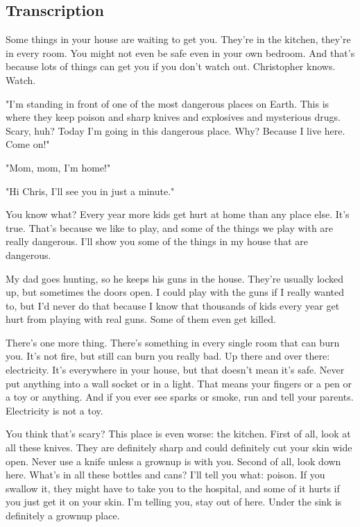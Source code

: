 \subsection{Transcription}

Some things in your house are waiting to get you. They're in the kitchen, they're in every room. You might not even be safe even in your own bedroom. And that's because lots of things can get you if you don't watch out. Christopher knows. Watch.

"I'm standing in front of one of the most dangerous places on Earth. This is where they keep poison and sharp knives and explosives and mysterious drugs. Scary, huh? Today I'm going in this dangerous place. Why? Because I live here. Come on!"

"Mom, mom, I'm home!"

"Hi Chris, I'll see you in just a minute."

You know what? Every year more kids get hurt at home than any place else. It's true. That's because we like to play, and some of the things we play with are really dangerous. I'll show you some of the things in my house that are dangerous.

My dad goes hunting, so he keeps his guns in the house. They're usually locked up, but sometimes the doors open. I could play with the guns if I really wanted to, but I'd never do that because I know that thousands of kids every year get hurt from playing with real guns. Some of them even get killed.

There's one more thing. There's something in every single room that can burn you. It's not fire, but still can burn you really bad. Up there and over there: electricity. It's everywhere in your house, but that doesn't mean it's safe. Never put anything into a wall socket or in a light. That means your fingers or a pen or a toy or anything. And if you ever see sparks or smoke, run and tell your parents. Electricity is not a toy.

You think that's scary? This place is even worse: the kitchen. First of all, look at all these knives. They are definitely sharp and could definitely cut your skin wide open. Never use a knife unless a grownup is with you. Second of all, look down here. What's in all these bottles and cans? I'll tell you what: poison. If you swallow it, they might have to take you to the hospital, and some of it hurts if you just get it on your skin. I'm telling you, stay out of here. Under the sink is definitely a grownup place.

